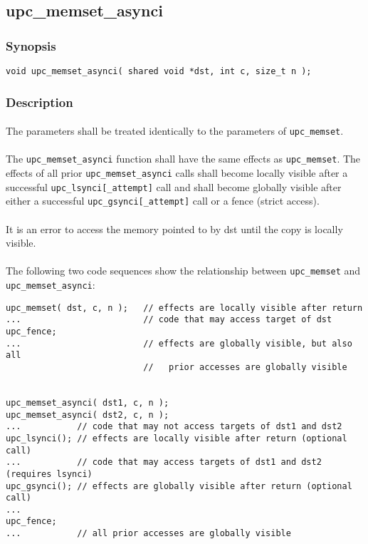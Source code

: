 \documentclass[10pt]{article}
\def \memset  {{\tt upc\_memset}}
\def \gsynci {{\tt upc\_gsynci[\_attempt]}}
\def \lsynci {{\tt upc\_lsynci[\_attempt]}}
\begin{document}
\newpage
\subsection{upc\_memset\_asynci}
\def\function{{\tt upc\_memset\_asynci}}

\subsubsection{Synopsis}

\begin{verbatim}
void upc_memset_asynci( shared void *dst, int c, size_t n );
\end{verbatim}

\subsubsection{Description}

\paragraph{} The parameters shall be treated identically to the parameters of
\memset{}.

\paragraph{} The \function{} function shall have the same effects as \memset{}.
The effects of all prior \function{} calls shall become locally visible after a
successful \lsynci{} call and shall become globally visible after either a
successful \gsynci{} call or a fence (strict access).

\paragraph{} It is an error to access the memory pointed to by dst until
the copy is locally visible.

\paragraph{} The following two code sequences show the relationship between
\memset{} and \function{}:

\begin{verbatim} 
upc_memset( dst, c, n );   // effects are locally visible after return
...                        // code that may access target of dst
upc_fence;                 
...                        // effects are globally visible, but also all
                           //   prior accesses are globally visible


upc_memset_asynci( dst1, c, n );
upc_memset_asynci( dst2, c, n );
...           // code that may not access targets of dst1 and dst2
upc_lsynci(); // effects are locally visible after return (optional call)
...           // code that may access targets of dst1 and dst2 (requires lsynci)
upc_gsynci(); // effects are globally visible after return (optional call)
...
upc_fence;
...           // all prior accesses are globally visible
\end{verbatim}
\end{document}
